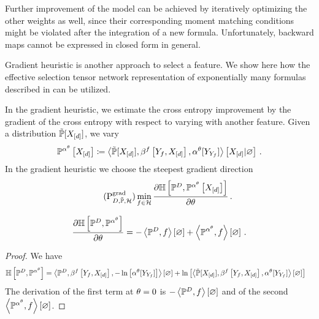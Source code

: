 Further improvement of the model can be achieved by iteratively optimizing the other weights as well, since their corresponding moment matching conditions might be violated after the integration of a new formula.
Unfortunately, backward maps cannot be expressed in closed form in general.




Gradient heuristic is another approach to select a feature.
We show here how the effective selection tensor network representation of exponentially many formulas described in  can be utilized. %

In the gradient heuristic, we estimate the cross entropy improvement by the gradient of the cross entropy with respect to varying with another feature.
Given a distribution $\tilde{\mathbb{P}}[X_{[d]}]$, we vary %
\begin{align*}
    \mathbb{P}^{\alpha^{\theta}}\left[X_{[d]}\right] \coloneqq \left\langle \tilde{\mathbb{P}}[X_{[d]}],\beta^{f}\left[Y_{f},X_{[d]}\right],\alpha^{\theta}[Y_{Y_{f}}]\right\rangle \left[ X_{[d]} | \varnothing \right] \, .
\end{align*}
In the gradient heuristic we choose the steepest gradient direction
\begin{align}
    \label{prob:greedyGrad}\tag{$\probtagtypeinst{\gradientsymbol}{\datamap,\secprobtensor,\greedyhypothesis}$}
    \min_{\formula\in\greedyhypothesis} \difofwrt{\centropyof{\empdistribution}{\probofat{\actcoreof{\canparam}}{\shortcatvariables}}}{\canparam}   \, .
\end{align}

\begin{lemma}
    \begin{align*}
        \frac{\partial \mathbb{H}\left[\mathbb{P}^{D},\mathbb{P}^{\alpha^{\theta}}\right]}{\partial \theta} =
        -\left\langle \mathbb{P}^{D},f\right\rangle \left[ \varnothing \right] + \left\langle \mathbb{P}^{\alpha^{\theta}},f\right\rangle \left[ \varnothing \right] \, .
    \end{align*}
\end{lemma}
\begin{proof}
    We have
    \begin{align*}
        \mathbb{H}\left[\mathbb{P}^{D},\mathbb{P}^{\alpha^{\theta}}\right]
        & = \left\langle \mathbb{P}^{D},\beta^{f}\left[Y_{f},X_{[d]}\right],-\ln \left[ \alpha^{\theta}[Y_{Y_{f}}] \right]\right\rangle \left[ \varnothing \right]
        + \ln \left[ \left\langle \tilde{\mathbb{P}}[X_{[d]}],\beta^{f}\left[Y_{f},X_{[d]}\right],\alpha^{\theta}[Y_{Y_{f}}]\right\rangle \left[ \varnothing \right] \right]
    \end{align*}
    The derivation of the first term at $\theta=0$ is $-\left\langle \mathbb{P}^{D},f\right\rangle \left[ \varnothing \right]$ and of the second $\left\langle \mathbb{P}^{\alpha^{\theta}},f\right\rangle \left[ \varnothing \right]$.
\end{proof}

